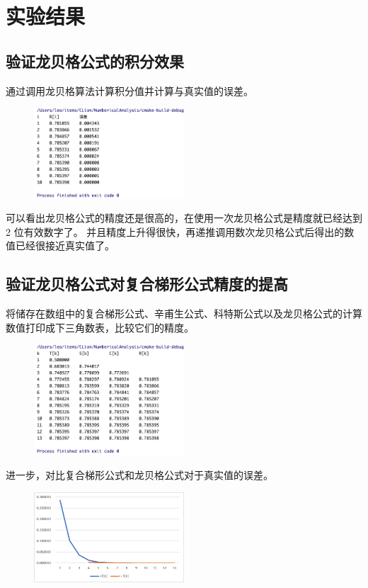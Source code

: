 \documentclass[lang=cn,11pt,a4paper]{elegantpaper}
\begin{document}
\section{实验结果}
\subsection{验证龙贝格公式的积分效果}
通过调用龙贝格算法计算积分值并计算与真实值的误差。
\begin{figure}[htbp]
  \centering
  \includegraphics[width=0.5\textwidth]{image/Romberg_1.png}
\end{figure}

可以看出龙贝格公式的精度还是很高的，在使用一次龙贝格公式是精度就已经达到 2 位有效数字了。
并且精度上升得很快，再递推调用数次龙贝格公式后得出的数值已经很接近真实值了。

\subsection{验证龙贝格公式对复合梯形公式精度的提高}
将储存在数组中的复合梯形公式、辛甫生公式、科特斯公式以及龙贝格公式的计算数值打印成下三角数表，比较它们的精度。
\clearpage

\begin{figure}[htbp]
  \centering
  \includegraphics[width=0.5\textwidth]{image/Romberg_2.png}
\end{figure}

进一步，对比复合梯形公式和龙贝格公式对于真实值的误差。
\begin{figure}[htbp]
  \centering
  \includegraphics[width=0.5\textwidth]{image/T_R.png}
\end{figure}
\end{document}
